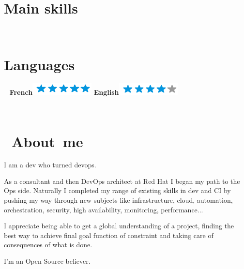 \documentclass[]{friggeri-cv}
\begin{document}
\begin{aside}
    \section{Main skills}
    ~
    ~
    ~
    \section{Languages}
    ~
    \textbf{French}\includegraphics[scale=0.40]{img/5stars.png}\vspace{4pt}
    \textbf{English}\includegraphics[scale=0.40]{img/4stars.png}
    ~    
\end{aside}
~
\newlength{\parsepsave}
\section{\ About\ me} 
 \qquad I am a dev who turned devops. 
 
 \vspace{-4pt}
 \qquad  As a consultant and then DevOps architect at Red Hat I began my path to the Ops side. Naturally I completed my range of existing skills in dev and CI by pushing my way through new subjects like infrastructure, cloud, automation, orchestration, security, high availability, monitoring, performance...
 
 \vspace{-4pt}
 \qquad   I appreciate being able to get a global understanding of a project, finding the best way to achieve final goal function of constraint and taking care of consequences of what is done. 
 
 \vspace{-4pt}
 \qquad  I'm an Open Source believer.  
\end{document}
